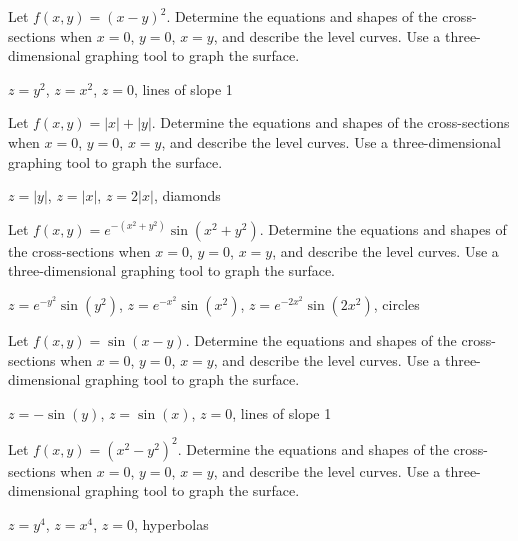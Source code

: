 \begin{exercises}

\exercise Let $f(x,y)=(x-y)^2$. 
Determine the equations and shapes of the cross-sections when
$x=0$, $y=0$, $x=y$, and describe the level curves.
Use a three-dimensional graphing tool to graph the surface.
\begin{answer} $z=y^2$, $z=x^2$, $z=0$, lines of slope 1
\end{answer}

\exercise Let $f(x,y)=|x|+|y|$. 
Determine the equations and shapes of the cross-sections when
$x=0$, $y=0$, $x=y$, and describe the level curves.
Use a three-dimensional graphing tool to graph the surface.
\begin{answer} $z=|y|$, $z=|x|$, $z=2|x|$, diamonds
\end{answer}

\exercise Let $f(x,y)=e^{-(x^2+y^2)}\sin(x^2+y^2)$. 
Determine the equations and shapes of the cross-sections when
$x=0$, $y=0$, $x=y$, and describe the level curves.
Use a three-dimensional graphing tool to graph the surface.
\begin{answer} $z=e^{-y^2}\sin(y^2)$, $z=e^{-x^2}\sin(x^2)$, 
$z=e^{-2x^2}\sin(2x^2)$, circles
\end{answer}

\exercise Let $f(x,y)=\sin(x-y)$. 
Determine the equations and shapes of the cross-sections when
$x=0$, $y=0$, $x=y$, and describe the level curves.
Use a three-dimensional graphing tool to graph the surface.
\begin{answer} $z=-\sin(y)$, $z=\sin(x)$, 
$z=0$, lines of slope 1
\end{answer}

\exercise Let $f(x,y)=(x^2-y^2)^2$. 
Determine the equations and shapes of the cross-sections when
$x=0$, $y=0$, $x=y$, and describe the level curves.
Use a three-dimensional graphing tool to graph the surface.
\begin{answer} $z=y^4$, $z=x^4$, 
$z=0$, hyperbolas
\end{answer}



\end{exercises}
